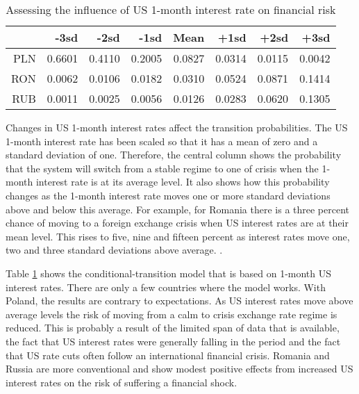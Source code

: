 \documentclass[12pt, a4paper, oneside]{article}\usepackage[]{graphicx}\usepackage[]{color}
\begin{document}
\begin{table}[t]
\begin{threeparttable}
\centering
\begin{tabular}{rrrrrrrr}
  \hline
 & -3sd & -2sd & -1sd & Mean & +1sd & +2sd & +3sd \\ 
  \hline
  PLN & 0.6601 & 0.4110 & 0.2005 & 0.0827 & 0.0314 & 0.0115 & 0.0042 \\
  RON & 0.0062 & 0.0106 & 0.0182 & 0.0310 & 0.0524 & 0.0871 & 0.1414 \\ 
  RUB & 0.0011 & 0.0025 & 0.0056 & 0.0126 & 0.0283 & 0.0620 & 0.1305 \\
   \hline
\end{tabular}
\begin{tablenotes}
\small
\item Changes in US 1-month interest rates affect the transition probabilities.  The US 1-month interest rate has been scaled so that it has a mean of zero and a standard deviation of one.  Therefore, the central column shows the probability that the system will switch from a stable regime to one of crisis when the 1-month interest rate is at its average level.  It also shows how this probability changes as the 1-month interest rate moves one or more standard deviations above and below this average. For example, for Romania there is a three percent chance of moving to a foreign exchange crisis when US interest rates are at their mean level.  This rises to five, nine and fifteen percent as interest rates move one, two and three standard deviations above average. .  
\end{tablenotes}
\caption{Assessing the influence of US 1-month interest rate on financial risk} 
\label{tabref:1mtranprob}
\end{threeparttable}
\end{table}

Table \ref{tabref:1mtranprob} shows the conditional-transition model that is based on 1-month US interest rates.  There are only a few countries where the model works.  With Poland, the results are contrary to expectations.  As US interest rates move above average levels the risk of moving from a calm to crisis exchange rate regime is reduced.  This is probably a result of the limited span of data that is available, the fact that US interest rates were generally falling in the period and the fact that US rate cuts often follow an international financial crisis.  Romania and Russia are more conventional and show modest positive effects from increased US interest rates on the risk of suffering a financial shock.
\end{document}

